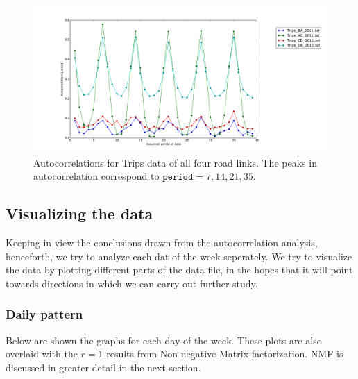 \documentclass[10pt,a4paper]{amsart}
\begin{document}
\begin{figure}[h!]
\centering
\includegraphics[scale=0.35]{Figures/Autocorrelation_Trips.pdf}
\caption{Autocorrelations for Trips data of all four road links. The peaks in
autocorrelation correspond to \(\mathtt{period}=7,14,21,35\).}
\end{figure}

\newpage
\subsection{Visualizing the data}
Keeping in view the conclusions drawn from the autocorrelation analysis,
henceforth, we try to analyze each dat of the week seperately. We try to
visualize the data by plotting different parts of the data file, in the hopes
that it will point towards directions in which we can carry out further study. 

\subsubsection{Daily pattern}
Below are shown the graphs for each day of the week. These plots are also
overlaid with the \(r=1\) results from Non-negative Matrix factorization. NMF
is discussed in greater detail in the next section.
\end{document}
